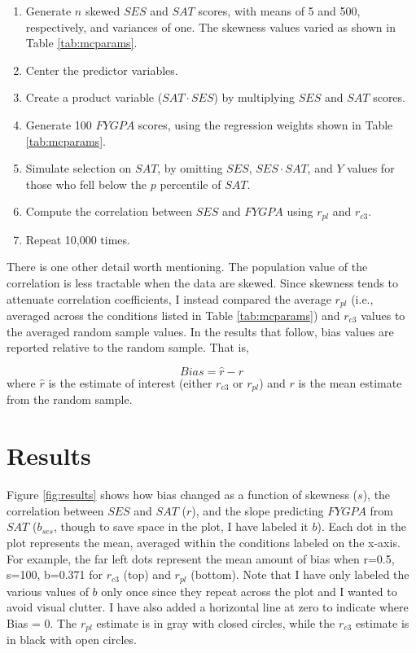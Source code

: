 \documentclass[english,man]{apa6}
\providecommand{\tightlist}{%
  \setlength{\itemsep}{0pt}\setlength{\parskip}{0pt}}
\theoremstyle{definition}
\theoremstyle{definition}
\theoremstyle{remark}
\begin{document}
\begin{enumerate}
\def\labelenumi{(\arabic{enumi})}
\tightlist
\item
  Generate \(n\) skewed \(SES\) and \(SAT\) scores, with means of 5 and
  500, respectively, and variances of one. The skewness values varied as
  shown in Table \ref{tab:mcparams}.
\item
  Center the predictor variables.
\item
  Create a product variable (\(SAT\cdot SES\)) by multiplying \(SES\)
  and \(SAT\) scores.
\item
  Generate 100 \(FYGPA\) scores, using the regression weights shown in
  Table \ref{tab:mcparams}.
\item
  Simulate selection on \(SAT\), by omitting \(SES\), \(SES\cdot SAT\),
  and \(Y\) values for those who fell below the \(p\) percentile of
  \(SAT\).
\item
  Compute the correlation between \(SES\) and \(FYGPA\) using \(r_{pl}\)
  and \(r_{c3}\).
\item
  Repeat 10,000 times.
\end{enumerate}

There is one other detail worth mentioning. The population value of the
correlation is less tractable when the data are skewed. Since skewness
tends to attenuate correlation coefficients, I instead compared the
average \(r_{pl}\) (i.e., averaged across the conditions listed in Table
\ref{tab:mcparams}) and \(r_{c3}\) values to the averaged random sample
values. In the results that follow, bias values are reported relative to
the random sample. That is,

\[Bias = \hat{r}-r\] \noindent where \(\hat{r}\) is the estimate of
interest (either \(r_{c3}\) or \(r_{pl}\)) and \(r\) is the mean
estimate from the random sample.

\section{Results}\label{results}

Figure \ref{fig:results} shows how bias changed as a function of
skewness (\(s\)), the correlation between \(SES\) and \(SAT\) (\(r\)),
and the slope predicting \(FYGPA\) from \(SAT\) (\(b_{ses}\), though to
save space in the plot, I have labeled it \(b\)). Each dot in the plot
represents the mean, averaged within the conditions labeled on the
x-axis. For example, the far left dots represent the mean amount of bias
when r=0.5, s=100, b=0.371 for \(r_{c3}\) (top) and \(r_{pl}\) (bottom).
Note that I have only labeled the various values of \(b\) only once
since they repeat across the plot and I wanted to avoid visual clutter.
I have also added a horizontal line at zero to indicate where Bias = 0.
The \(r_{pl}\) estimate is in gray with closed circles, while the
\(r_{c3}\) estimate is in black with open circles.
\end{document}
